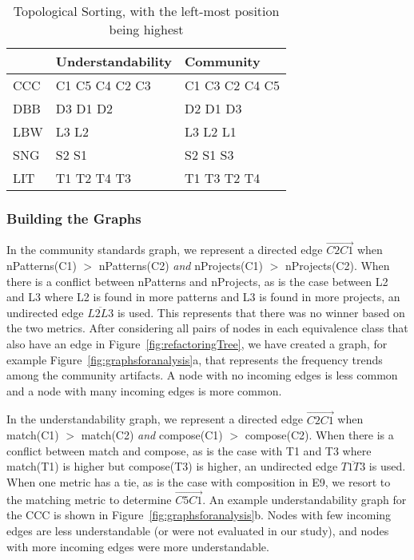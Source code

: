 \begin{table}
\centering
\caption{Topological Sorting, with the left-most position being highest \label{topologicalResults}}
\vspace{-6pt}
\begin{tabular}{| l | l | l |}  \hline
& Understandability & Community  \\ \hline 
CCC & C1 C5 C4 C2 C3  &   C1 C3 C2 C4 C5  \\
DBB & D3 D1 D2  &   D2 D1 D3\\
 LBW & L3 L2	 &  L3 L2 L1 	\\
 SNG &  S2 S1 &  S2 S1 S3 \\
 LIT & T1 T2 T4 T3 & T1 T3 T2 T4 \\
\hline
\end{tabular}
\end{table}


\subsubsection{Building the Graphs}
In the community standards graph, we represent a directed edge  $\overrightarrow{C2  C1}$ when  nPatterns(C1) $>$ nPatterns(C2) \emph{and}  nProjects(C1) $>$ nProjects(C2).
When there is a conflict between nPatterns and nProjects, as is the case between L2 and L3 where L2 is found in more patterns and L3 is found in more projects, an undirected edge $\overline{L2L3}$ is used.
This represents that there was no winner based on the two metrics. 
After considering all pairs of nodes in each equivalence class that also have an edge in Figure~\ref{fig:refactoringTree}, we have created a graph, for example Figure~\ref{fig:graphsforanalysis}a, that represents the frequency trends among the community artifacts. A node with no incoming edges is less common and a node with many incoming edges is more common. 

In the understandability graph, we represent a directed edge  $\overrightarrow{C2C1}$ when match(C1) $>$ match(C2) \emph{and} compose(C1) $>$ compose(C2). When there is a conflict between match and compose, as is the case with T1 and T3 where match(T1) is higher but compose(T3) is higher, an undirected edge $\overline{T1T3}$ is used. When one metric has a tie, as is the case with composition in E9, we resort to the matching metric to determine  $\overrightarrow{C5C1}$. An example understandability graph for the CCC is shown in Figure~\ref{fig:graphsforanalysis}b. Nodes with few incoming edges are less understandable (or were not evaluated in our study), and nodes with more incoming edges were more understandable. 

